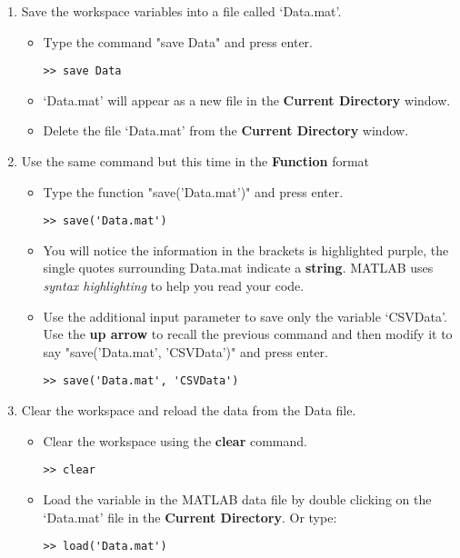 \documentclass[12pt,a4paper]{article}
\begin{document}
\begin{enumerate}
\begin{itemize}
	\end{itemize}
	\item Save the workspace variables into a file called `Data.mat'.  
    	\begin{itemize}	
    		\item Type the command "save Data" and press enter.
    		\begin{lstlisting}[style=Matlab-editor]
    >> save Data
    		\end{lstlisting}	
    		\item `Data.mat' will appear as a new file in the \textbf{Current Directory} window.
    		\item Delete the file `Data.mat' from the \textbf{Current Directory} window.
    	\end{itemize}
	\item Use the same command but this time in the \textbf{Function} format
    	\begin{itemize}	
    		\item Type the function "save('Data.mat')" and press enter.
    		\begin{lstlisting}[style=Matlab-editor]
    >> save('Data.mat')
    		\end{lstlisting}	
    		\item You will notice the information in the brackets is highlighted purple, the single quotes surrounding Data.mat indicate a \textbf{string}. MATLAB uses \emph{syntax highlighting} to help you read your code.	
    		\item Use the additional input parameter to save only the variable `CSVData'.  Use the \textbf{up arrow} to recall the previous command and then modify it to say "save('Data.mat', 'CSVData')" and press enter.\\
    		\begin{lstlisting}[style=Matlab-editor]
    >> save('Data.mat', 'CSVData')
    		\end{lstlisting}	
    	\end{itemize}	
	
	\item Clear the workspace and reload the data from the Data file.
	\begin{itemize}	
		\item Clear the workspace using the \textbf{clear} command.
		\begin{lstlisting}[style=Matlab-editor]
>> clear
		\end{lstlisting}
		\item Load the variable in the MATLAB data file by double clicking on the `Data.mat' file in the \textbf{Current Directory}. Or type:
		\begin{lstlisting}[style=Matlab-editor]
>> load('Data.mat') 
		\end{lstlisting}
	\end{itemize}
\end{enumerate}
\end{document}
